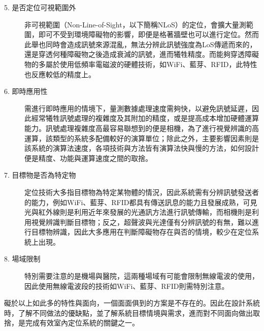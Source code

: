 \begin{description}
    


    
    \item[5. 是否定位可視範圍外] \hfill 
    
    \qquad
    非可視範圍（Non-Line-of-Sight，以下簡稱NLoS）的定位，會擴大量測範圍，即可不受到環境障礙物的影響，即便是格著牆壁也可以進行定位。然而此舉也同時會造成訊號來源混亂，無法分辨此訊號強度為LoS傳遞而來的，還是穿透何種障礙物之後造成衰減的訊號，進而犧牲精度。而能夠穿透障礙物的多屬於使用低頻率電磁波的硬體技術，如WiFi、藍芽、RFID，此特性也反應較低的精度上。


    \item[6. 即時應用性] \hfill 
    
    \qquad
    需進行即時應用的情境下，量測數據處理速度需夠快，以避免訊號延遲，因此經常犧牲訊號處理的複雜度及其附加的精度，或是提高成本增加硬體運算能力。訊號處理複雜度高最容易聯想到的便是相機，為了進行視覺辨識的高運算，該類型的系統多配備較好的演算單位\cite{survey_light2020}；除此之外，主要影響因素則是該系統的演算法速度，各項技術與方法皆有演算法快與慢的方法，如何設計便是精度、功能與運算速度之間的取捨。
    
    \item[7. 目標物是否為特定物] \hfill 
    
    \qquad
    定位技術大多指目標物為特定某物體的情況，因此系統需有分辨訊號發送者的能力，例如WiFi、藍芽、RFID都具有傳送訊息的能力且發展成熟\cite{survey:indoor_wayfinding}，可見光與紅外線則是利用近年來發展的光通訊方法進行訊號傳輸，而相機則是利用視覺辨識判斷目標物；反之，超聲波與光達僅有分辨訊號的有無，難以進行目標物辨識，因此大多應用在判斷障礙物存在與否的情境，較少在定位系統上出現。
    
    \item[8. 場域限制]\hfill 
    
    \qquad
    特別需要注意的是機場與醫院，這兩種場域有可能會限制無線電波的使用\cite{case:vlc_mobile}，因此使用無線電波段的技術如WiFi、藍芽、RFID則需特別注意。
\end{description}

\hfill

礙於以上如此多的特性與面向，一個面面俱到的方案是不存在的。因此在設計系統時，了解不同做法的優缺點，並了解系統目標情境與需求，進而對不同面向做出取捨，是完成有效室內定位系統的關鍵之一\cite{survey_indoor2018}。













